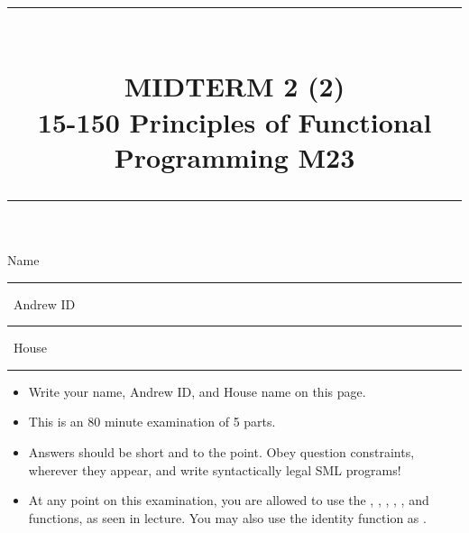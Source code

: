 \documentclass[addpoints,12pt]{exam}
\newcommand{\HRule}[1]{\rule{\linewidth}{#1}}
\begin{document}
\pagestyle{headandfoot}
\footer{}{\thepage}{}


\setlength{\droptitle}{-8em}   %

\title{ \normalsize \textsc{}
		\HRule{1.5pt} \\
		\large \textbf{
      \uppercase{Midterm 2 (2)} \\
      15-150 Principles of Functional Programming M23} \\
    \HRule{1.5pt}
}
\date{}

\maketitle

\vspace{-3cm}

\hspace{-1cm} Name \rule{5cm}{0.4pt} \, Andrew ID \rule{3cm}{0.4pt} \, House \rule{3.5cm}{0.4pt}

\vspace{5pt}

\begin{itemize}
  \item Write your name, Andrew ID, and House name on this page.
  \item This is an 80 minute examination of 5 parts.
  \item Answers should be short and to the point. Obey question constraints, wherever
  they appear, and write syntactically legal SML programs!
  \item At any point on this examination, you are allowed to use the ,
  , , , , and  functions,
  as seen in lecture. You may also use the identity function as .
\end{itemize}
\vspace{\fill}

{\small
\vqword{}
\begin{center}
\gradetable[v][questions]
\end{center}
}
\end{document}
